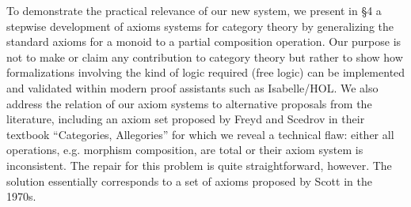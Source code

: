   
To demonstrate the practical relevance of our new system, we present
in \S4 a stepwise development of axioms
systems for category theory by generalizing the standard axioms for a
monoid to a partial composition operation. Our purpose is not to make
or claim any contribution to category theory but rather to show how
formalizations involving the kind of logic required (free logic) can
be implemented and validated within modern proof assistants such as
Isabelle/HOL.  We also address the relation of our axiom systems to
alternative proposals from the literature, including an axiom set
proposed by Freyd and Scedrov in their textbook ``Categories,
Allegories'' \cite{FreydScedrov90} for which we reveal a technical
flaw: either all operations, e.g. morphism composition, are total or
their axiom system is inconsistent. The repair for this problem is
quite straightforward, however. The solution essentially corresponds
to a set of axioms proposed by Scott \cite{Scott79} in the 1970s.

